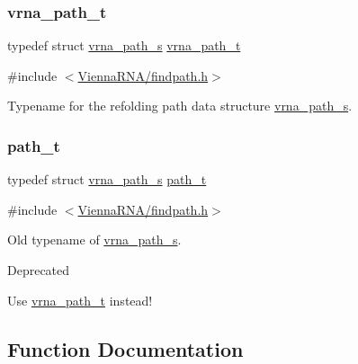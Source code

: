 \subsubsection{\texorpdfstring{vrna\+\_\+path\+\_\+t}{vrna\_path\_t}}
{\footnotesize\ttfamily typedef struct \mbox{\hyperlink{group__direct__paths_structvrna__path__s}{vrna\+\_\+path\+\_\+s}} \mbox{\hyperlink{group__direct__paths_ga818d4f3d1cf8723d6905990b08d909fe}{vrna\+\_\+path\+\_\+t}}}



{\ttfamily \#include $<$\mbox{\hyperlink{findpath_8h}{Vienna\+R\+N\+A/findpath.\+h}}$>$}



Typename for the refolding path data structure \mbox{\hyperlink{group__direct__paths_structvrna__path__s}{vrna\+\_\+path\+\_\+s}}. 

\mbox{\label{group__direct__paths_gab6b8737d5377e70a7815d04aae7fd884}} 
\subsubsection{\texorpdfstring{path\+\_\+t}{path\_t}}
{\footnotesize\ttfamily typedef struct \mbox{\hyperlink{group__direct__paths_structvrna__path__s}{vrna\+\_\+path\+\_\+s}} \mbox{\hyperlink{group__direct__paths_gab6b8737d5377e70a7815d04aae7fd884}{path\+\_\+t}}}



{\ttfamily \#include $<$\mbox{\hyperlink{findpath_8h}{Vienna\+R\+N\+A/findpath.\+h}}$>$}



Old typename of \mbox{\hyperlink{group__direct__paths_structvrna__path__s}{vrna\+\_\+path\+\_\+s}}. 

\begin{DoxyRefDesc}{Deprecated}
\item[\mbox{\hyperlink{deprecated__deprecated000069}{Deprecated}}]Use \mbox{\hyperlink{group__direct__paths_ga818d4f3d1cf8723d6905990b08d909fe}{vrna\+\_\+path\+\_\+t}} instead! \end{DoxyRefDesc}


\subsection{Function Documentation}
\mbox{\label{group__direct__paths_gad611574a76593e26021f177e7854b6b4}} 
